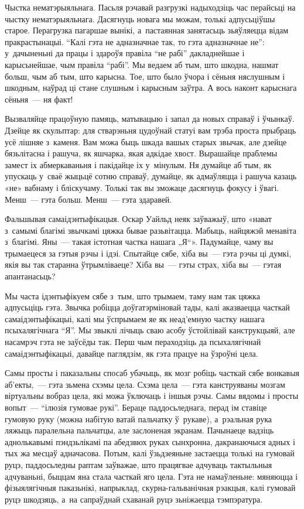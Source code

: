 Чыстка нематэрыяльнага. Пасьля рэчавай разгрузкі надыходзіць час перайсьці на чыстку нематэрыяльнага. Дасягнуць новага мы можам, толькі адпусьціўшы старое. Перагрузка пагаршае вынікі, а~пастаянная занятасьць зьяўляецца відам пракрастынацыі. ``Калі гэта не адназначнае так, то гэта адназначнае не'': у~дачыненьні да працы і здароўя правіла ``не рабі'' дакладнейшае і карысьнейшае, чым правіла ``рабі''. Мы ведаем аб тым, што шкодна, нашмат больш, чым аб тым, што карысна. Тое, што было ўчора і сёньня няслушным і шкодным, наўрад ці стане слушным і карысным заўтра. А вось наконт карыснага сёньня~--- ня факт!

Вызваляйце працоўную памяць, матывацыю і запал да новых справаў і ўчынкаў. Дзейце як скульптар: для стварэньня цудоўнай статуі вам трэба проста прыбраць усё лішняе з~каменя. Вам можа быць шкада вашых старых звычак, але дзейце бязьлітасна і рашуча, як яшчарка, якая адкідае хвост. Вырашайце праблемы замест іх абмеркаваньня і пакідайце іх у~мінулым. Ня думайце аб тым, як упускаць у~сваё жыцьцё сотню справаў, думайце, як адмаўляцца і рашуча казаць «не» вабнаму і бліскучаму. Толькі так вы зможаце дасягнуць фокусу і ўвагі. Менш~--- гэта больш. Менш~--- гэта здаравей.

Фальшывая самаідэнтыфікацыя. Оскар Уайльд неяк заўважыў, што «нават з~самымі благімі звычкамі цяжка бывае разьвітацца. Мабыць, найцяжэй менавіта з~благімі. Яны~--- такая істотная частка нашага „Я“». Падумайце, чаму вы трымаецеся за гэтыя рэчы і ідэі. Спытайце сябе, хіба вы~--- гэта рэчы ці думкі, якія вы так старанна ўтрымліваеце? Хіба вы~--- гэты страх, хіба вы~--- гэтая апантанасьць?

Мы часта ідэнтыфікуем сябе з~тым, што трымаем, таму нам так цяжка адпусьціць гэта. Звычка робіцца доўгатэрміновай тады, калі аказваецца часткай самаідэнтыфікацыі, калі мы ўспрымаем яе як неад'емную частку нашага псыхалягічнага ``Я''. Мы звыклі лічыць сваю асобу ўстойлівай канструкцыяй, але насамрэч гэта не заўсёды так. Перш чым пераходзіць да псыхалягічнай самаідэнтыфікацыі, давайце паглядзім, як гэта працуе на ўзроўні цела.

Самы просты і паказальны спосаб убачыць, як мозг робіць часткай сябе вонкавыя аб'екты,~--- гэта зьмена схэмы цела. Схэма цела~--- гэта канструяваны мозгам віртуальны вобраз цела, які можа ўключаць і іншыя рэчы. Самы вядомы і просты вопыт~--- ``ілюзія гумовае рукі''. Бераце паддосьледнага, перад ім ставіце гумовую руку (можна набітую ватай пальчатку ў~рукаве), а~рэальная рука ляжыць паралельна пальчатцы, але заслоненая экранам. Пачынаеце вадзіць аднолькавымі пэндзьлікамі па абедзвюх руках сынхронна, дакранаючыся адных і тых жа месцаў адначасова. Потым, калі ўзьдзеяньне застаецца толькі на гумовай руцэ, паддосьледны раптам заўважае, што працягвае адчуваць тактыльныя адчуваньні, быццам яна стала часткай яго цела. Гэта не намаўленьне: мяняюцца і фізыялягічныя паказьнікі, напрыклад, скурна-гальванічная рэакцыя, калі гумовай руцэ шкодзяць, а~на сапраўднай схаванай руцэ зьніжаецца тэмпэратура.

